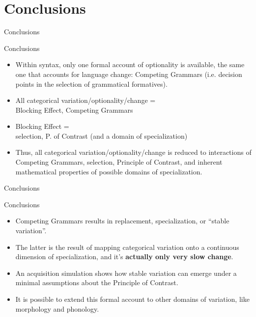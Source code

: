\documentclass[hyperref={pdfpagelabels=false}]{beamer}
\begin{document}
\section{Conclusions}





\begin{frame}{Conclusions}
	\begin{block}{Conclusions}
		\begin{itemize}
			\item Within syntax, only one formal account of optionality is available, the same one that accounts for language change: Competing Grammars (i.e. decision points in the selection of grammatical formatives).
			\item All categorical variation/optionality/change = \\Blocking Effect, Competing Grammars
			\item Blocking Effect = \\
			selection, P. of Contrast (and a domain of specialization)
			\item Thus, all categorical variation/optionality/change is reduced to interactions of Competing Grammars, selection, Principle of Contrast, and inherent mathematical properties of possible domains of specialization.
				\end{itemize}
	\end{block}
\end{frame}


\begin{frame}{Conclusions}
	\begin{block}{Conclusions}
		\begin{itemize}
			\item Competing Grammars results in replacement, specialization, or ``stable variation''.
			\item The latter is the result of mapping categorical variation onto a continuous dimension of specialization, and it's \textbf{actually only very slow change}.
			\item An acquisition simulation shows how stable variation can emerge under a minimal assumptions about the Principle of Contrast.
			\item It is possible to extend this formal account to other domains of variation, like morphology and phonology.
		\end{itemize}
	\end{block}
	

\end{frame}
\end{document}
